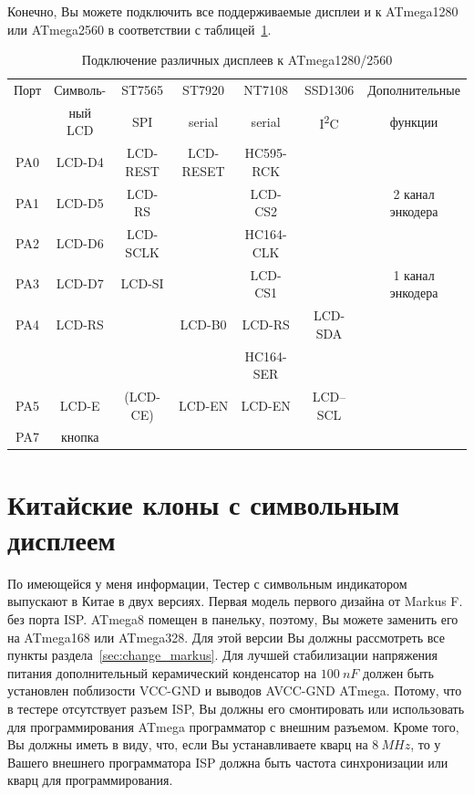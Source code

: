 Конечно, Вы можете подключить все поддерживаемые дисплеи и к ATmega1280 или ATmega2560
в соответствии с таблицей~\ref{tab:display-1280}.

\begin{table}[H]
  \begin{center}
    \begin{tabular}{| c || c | c | c | c | c | c |}
    \hline
      Порт & Символь-  &  ST7565     & ST7920       & NT7108       & SSD1306     & Дополнительные \\
           & ный LCD   &    SPI      & serial       & serial       & I\textsuperscript{2}C & функции \\
    \hline
    \hline
    PA0    &  LCD-D4   &   LCD-REST  &  LCD-RESET   & HC595-RCK      &             & \\
    \hline
    PA1    &  LCD-D5   &   LCD-RS    &              & LCD-CS2        &             & 2 канал энкодера \\
    \hline
    PA2    &  LCD-D6   &   LCD-SCLK  &              & HC164-CLK      &             & \\
    \hline
    PA3    &  LCD-D7   &   LCD-SI    &              & LCD-CS1        &             & 1 канал энкодера \\
    \hline
    PA4    &  LCD-RS   &             &   LCD-B0     & LCD-RS         &   LCD-SDA   & \\
           &           &             &              & HC164-SER      &             & \\
    \hline
    PA5    &  LCD-E    &   (LCD-CE)  &   LCD-EN     & LCD-EN         &   LCD--SCL  & \\
    \hline
    PA7    &  кнопка   &             &              &                &             & \\
    \hline
    \end{tabular}
  \end{center}
  \caption{Подключение различных дисплеев к ATmega1280/2560}
  \label{tab:display-1280}
\end{table}
\section{Китайские клоны с символьным дисплеем}
По имеющейся у меня информации, Тестер с символьным индикатором выпускают в Китае в двух версиях.
Первая модель первого дизайна от Markus F. 
без порта ISP. ATmega8 помещен в панельку, поэтому, Вы можете заменить его на ATmega168 или ATmega328. Для этой версии 
Вы должны рассмотреть все пункты раздела~\ref{sec:change_markus}.
Для лучшей стабилизации напряжения питания дополнительный керамический конденсатор на \(100~nF\) должен быть установлен 
поблизости VCC-GND и выводов AVCC-GND ATmega. Потому, что в тестере отсутствует разъем ISP, Вы должны его смонтировать
или использовать для программирования ATmega программатор с внешним разъемом.   
Кроме того, Вы должны иметь в виду, что, если Вы устанавливаете кварц 
на \(8~MHz\), то у Вашего внешнего программатора ISP должна быть частота синхронизации или кварц для программирования.\\

